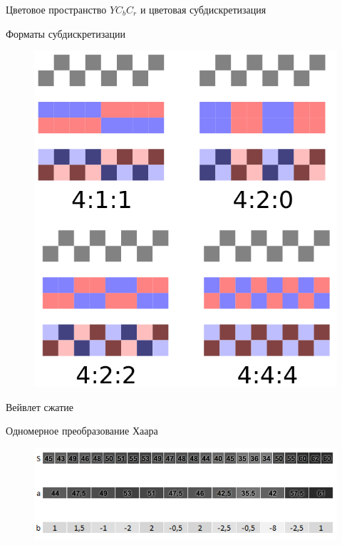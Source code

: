 \documentclass[11pt]{beamer}
\begin{document}
\begin{frame}{Цветовое пространство $YC_bC_r$ и цветовая субдискретизация}
\begin{block}{Форматы субдискретизации}
\begin{figure}[H]
	\begin{center}
		\includegraphics[scale=0.38]{../pics/chroma_subsampling/chroma_subsampling_ratios_pr.png}
	\end{center}
\end{figure}	
\end{block}				
\end{frame}



\begin{frame}{Вейвлет сжатие}
\begin{block}{Одномерное преобразование Хаара}
\begin{figure}[H]
	\begin{center}
		\includegraphics[scale=0.65]{../pics/wavelet/example.png}
	\end{center}
\end{figure}	
\end{block}				
\end{frame}
\end{document}
